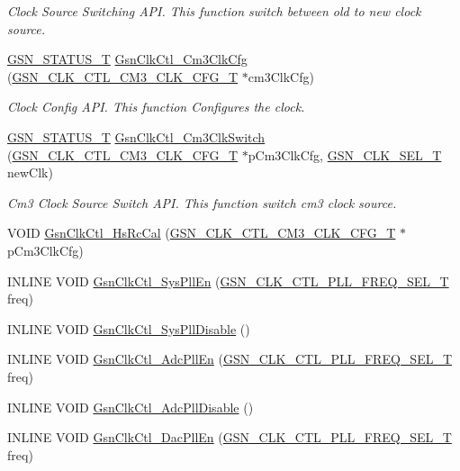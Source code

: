\begin{DoxyCompactItemize}
\begin{DoxyCompactList}\small\item\em Clock Source Switching API. This function switch between old to new clock source. \end{DoxyCompactList}\item 
\hyperlink{a00659_gae36517c0f5872426a7034c9551eb96ac}{GSN\_\-STATUS\_\-T} \hyperlink{a00644_gab47a206ddcbe7020c38010d7b073d7db}{GsnClkCtl\_\-Cm3ClkCfg} (\hyperlink{a00038}{GSN\_\-CLK\_\-CTL\_\-CM3\_\-CLK\_\-CFG\_\-T} $\ast$cm3ClkCfg)
\begin{DoxyCompactList}\small\item\em Clock Config API. This function Configures the clock. \end{DoxyCompactList}\item 
\hyperlink{a00659_gae36517c0f5872426a7034c9551eb96ac}{GSN\_\-STATUS\_\-T} \hyperlink{a00644_ga6198c49f77d396e7cbfe138fa1315674}{GsnClkCtl\_\-Cm3ClkSwitch} (\hyperlink{a00038}{GSN\_\-CLK\_\-CTL\_\-CM3\_\-CLK\_\-CFG\_\-T} $\ast$pCm3ClkCfg, \hyperlink{a00644_gaf4925c33b2dac850008f7d4463760580}{GSN\_\-CLK\_\-SEL\_\-T} newClk)
\begin{DoxyCompactList}\small\item\em Cm3 Clock Source Switch API. This function switch cm3 clock source. \end{DoxyCompactList}\item 
VOID \hyperlink{a00477_adf71e276b5ea31c6b657541fc4ee0bc9}{GsnClkCtl\_\-HsRcCal} (\hyperlink{a00038}{GSN\_\-CLK\_\-CTL\_\-CM3\_\-CLK\_\-CFG\_\-T} $\ast$pCm3ClkCfg)
\item 
INLINE VOID \hyperlink{a00477_a618d2ff082f9713b5c25330978521fd5}{GsnClkCtl\_\-SysPllEn} (\hyperlink{a00477_ac0f1ee78197c9b51f46253d4b8eefc02}{GSN\_\-CLK\_\-CTL\_\-PLL\_\-FREQ\_\-SEL\_\-T} freq)
\item 
INLINE VOID \hyperlink{a00477_ade29f0d2a451a9c995ad10b07d85f3c4}{GsnClkCtl\_\-SysPllDisable} ()
\item 
INLINE VOID \hyperlink{a00477_a5f4a6fbbe3d68f2780d33c5e1d78a655}{GsnClkCtl\_\-AdcPllEn} (\hyperlink{a00477_ac0f1ee78197c9b51f46253d4b8eefc02}{GSN\_\-CLK\_\-CTL\_\-PLL\_\-FREQ\_\-SEL\_\-T} freq)
\item 
INLINE VOID \hyperlink{a00477_ac739c0f99fb0524282db3d1676c8e0fd}{GsnClkCtl\_\-AdcPllDisable} ()
\item 
INLINE VOID \hyperlink{a00477_a7d5f8f21cda19589bb7dc0e3c7df2785}{GsnClkCtl\_\-DacPllEn} (\hyperlink{a00477_ac0f1ee78197c9b51f46253d4b8eefc02}{GSN\_\-CLK\_\-CTL\_\-PLL\_\-FREQ\_\-SEL\_\-T} freq)

\end{DoxyCompactItemize}
